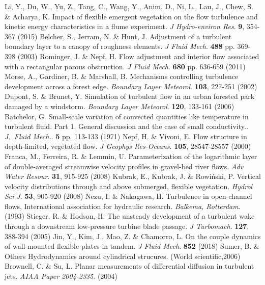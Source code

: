 \documentclass[lineno,authoryear]{FLO_v1}%
\theoremstyle{definition}
\begin{document}
\begin{Backmatter}
\begin{thebibliography}{}
Li, Y., Du, W., Yu, Z., Tang, C., Wang, Y., Anim, D., Ni, L., Lau, J., Chew, S. \& Acharya, K. Impact of flexible emergent vegetation on the flow turbulence and kinetic energy characteristics in a flume experiment. {\em J Hydro-environ Res}. \textbf{9}, 354-367 (2015)
Belcher, S., Jerram, N. \& Hunt, J. Adjustment of a turbulent boundary layer to a canopy of roughness elements. {\em J Fluid Mech}. \textbf{488} pp. 369-398 (2003)
Rominger, J. \& Nepf, H. Flow adjustment and interior flow associated with a rectangular porous obstruction. {\em J Fluid Mech}. \textbf{680} pp. 636-659 (2011)
Morse, A., Gardiner, B. \& Marshall, B. Mechanisms controlling turbulence development across a forest edge. {\em Boundary Layer Meteorol}. \textbf{103}, 227-251 (2002)
Dupont, S. \& Brunet, Y. Simulation of turbulent flow in an urban forested park damaged by a windstorm. {\em Boundary Layer Meteorol}. \textbf{120}, 133-161 (2006)
Batchelor, G. Small-scale variation of convected quantities like temperature in turbulent fluid. Part 1. General discussion and the case of small conductivity.. {\em J. Fluid Mech.}. \textbf{5} pp. 113-133 (1971)
Nepf, H. \& Vivoni, E. Flow structure in depth-limited, vegetated flow. {\em J Geophys Res-Oceans}. \textbf{105}, 28547-28557 (2000)
Franca, M., Ferreira, R. \& Lemmin, U. Parameterization of the logarithmic layer of double-averaged streamwise velocity profiles in gravel-bed river flows. {\em Adv Water Resour}. \textbf{31}, 915-925 (2008)
Kubrak, E., Kubrak, J. \& Rowiński, P. Vertical velocity distributions through and above submerged, flexible vegetation. {\em Hydrol Sci J}. \textbf{53}, 905-920 (2008)
Nezu, I. \& Nakagawa, H. Turbulence in open-channel flows, International association for hydraulic research. {\em Balkema, Rotterdam}. (1993)
Stieger, R. \& Hodson, H. The unsteady development of a turbulent wake through a downstream low-pressure turbine blade passage. {\em J Turbomach}. \textbf{127}, 388-394 (2005)
Jin, Y., Kim, J., Mao, Z. \& Chamorro, L. On the couple dynamics of wall-mounted flexible plates in tandem. {\em J Fluid Mech}. \textbf{852} (2018)
Sumer, B. \& Others Hydrodynamics around cylindrical strucures. (World scientific,2006)
Brownell, C. \& Su, L. Planar measurements of differential diffusion in turbulent jets. {\em AIAA Paper 2004-2335}. (2004)

\end{thebibliography}
\end{Backmatter}
\end{document}
